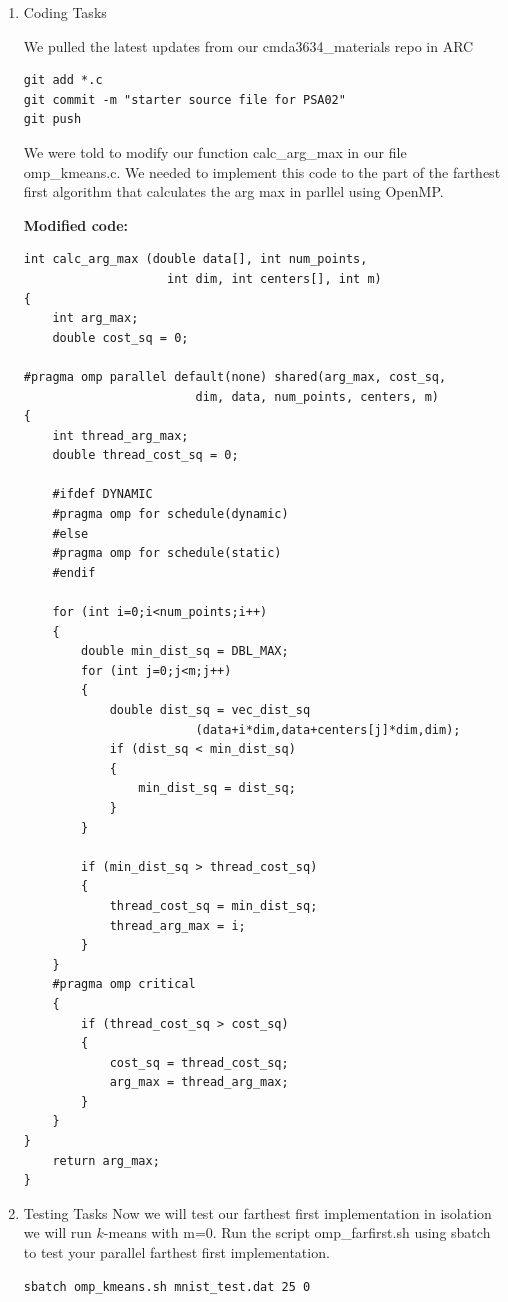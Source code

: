 \documentclass[12pt]{article}
\begin{document}
\begin{enumerate}
    \item Coding Tasks

We pulled the latest updates from our cmda3634\_materials repo in ARC
\begin{verbatim}
git add *.c
git commit -m "starter source file for PSA02"
git push
\end{verbatim}

We were told to modify our function calc\_arg\_max in our file omp\_kmeans.c. We needed to implement this code to the part of the farthest first algorithm that calculates the arg max in parllel using OpenMP.

\textbf{Modified code:}
\begin{verbatim}
int calc_arg_max (double data[], int num_points, 
                    int dim, int centers[], int m) 
{
    int arg_max;
    double cost_sq = 0;

#pragma omp parallel default(none) shared(arg_max, cost_sq, 
                        dim, data, num_points, centers, m)
{
    int thread_arg_max;
    double thread_cost_sq = 0;

    #ifdef DYNAMIC
    #pragma omp for schedule(dynamic)
    #else
    #pragma omp for schedule(static)
    #endif

    for (int i=0;i<num_points;i++) 
    {
        double min_dist_sq = DBL_MAX;
        for (int j=0;j<m;j++) 
        {
            double dist_sq = vec_dist_sq
                        (data+i*dim,data+centers[j]*dim,dim);
            if (dist_sq < min_dist_sq) 
            {
                min_dist_sq = dist_sq;
            }
        }

        if (min_dist_sq > thread_cost_sq) 
        {
            thread_cost_sq = min_dist_sq;
            thread_arg_max = i;
        }
    }
    #pragma omp critical
    {
        if (thread_cost_sq > cost_sq) 
        {
            cost_sq = thread_cost_sq;
            arg_max = thread_arg_max;
        }
    }
}
    return arg_max;
}
\end{verbatim}

    \item Testing Tasks
Now we will test our farthest first implementation in isolation we will run $k$-means with m=0.
Run the script omp\_farfirst.sh using sbatch to test your parallel farthest first implementation.
\begin{verbatim}
sbatch omp_kmeans.sh mnist_test.dat 25 0
\end{verbatim}


\end{enumerate}
\end{document}
